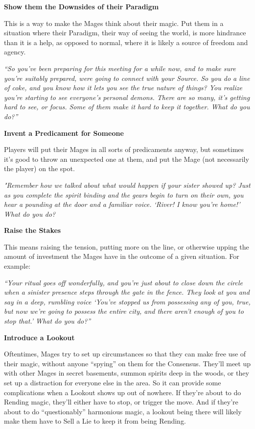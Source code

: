\documentclass[
  oneside,
  statementpaper,
  9pt]{memoir}
\begin{document}
\textbf{Show them the Downsides of their Paradigm}

This is a way to make the Mages think about their magic. Put them in a
situation where their Paradigm, their way of seeing the world, is more
hindrance than it is a help, as opposed to normal, where it is likely a
source of freedom and agency.

\emph{``So you've been preparing for this meeting for a while now, and
to make sure you're suitably prepared, were going to connect with your
Source. So you do a line of coke, and you know how it lets you see the
true nature of things? You realize you're starting to see everyone's
personal demons. There are so many, it's getting hard to see, or focus.
Some of them make it hard to keep it together. What do you do?''}

\textbf{Invent a Predicament for Someone}

Players will put their Mages in all sorts of predicaments anyway, but
sometimes it's good to throw an unexpected one at them, and put the Mage
(not necessarily the player) on the spot.

\emph{"Remember how we talked about what would happen if your sister
showed up? Just as you complete the spirit binding and the gears begin
to turn on their own, you hear a pounding at the door and a familiar
voice. `River! I know you're home!' What do you do?}

\textbf{Raise the Stakes}

This means raising the tension, putting more on the line, or otherwise
upping the amount of investment the Mages have in the outcome of a given
situation. For example:

\emph{``Your ritual goes off wonderfully, and you're just about to close
down the circle when a sinister presence steps through the gate in the
fence. They look at you and say in a deep, rumbling voice `You've
stopped us from possessing any of you, true, but now we're going to
possess the entire city, and there aren't enough of you to stop that.'
What do you do?''}

\textbf{Introduce a Lookout}

Oftentimes, Mages try to set up circumstances so that they can make free
use of their magic, without anyone ``spying'' on them for the Consensus.
They'll meet up with other Mages in secret basements, summon spirits
deep in the woods, or they set up a distraction for everyone else in the
area. So it can provide some complications when a Lookout shows up out
of nowhere. If they're about to do Rending magic, they'll either have to
stop, or trigger the move. And if they're about to do ``questionably''
harmonious magic, a lookout being there will likely make them have to
Sell a Lie to keep it from being Rending.
\end{document}
